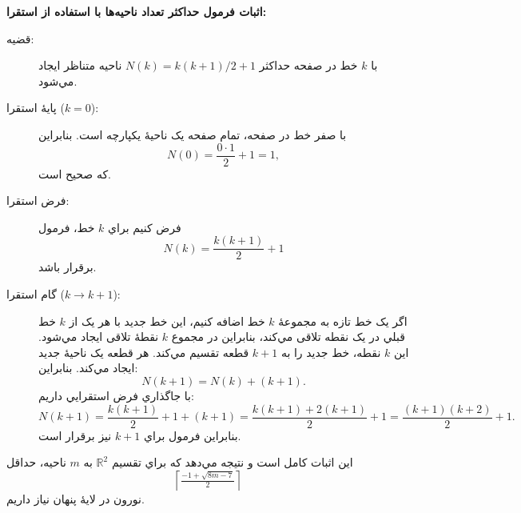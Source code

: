 \begin{enumerate}
	\vspace{1em}
	\noindent
	\textbf{اثبات فرمول حداکثر تعداد ناحیه‌ها با استفاده از استقرا:}
	
	\begin{description}
		\item[قضيه:] با $k$ خط در صفحه حداکثر $N(k)=k(k+1)/2+1$ ناحيه متناظر ايجاد مي‌شود.
		\item[پايهٔ استقرا ($k=0$):] با صفر خط در صفحه، تمام صفحه يک ناحيهٔ يکپارچه است. بنابراين
		\[
		N(0)=\frac{0\cdot1}{2}+1=1,
		\]
		که صحيح است.
		\item[فرض استقرا:] فرض کنيم براي $k$ خط، فرمول
		\[
		N(k)=\frac{k(k+1)}{2}+1
		\]
		برقرار باشد.
		\item[گام استقرا ($k\to k+1$):]
		اگر يک خط تازه به مجموعهٔ $k$ خط اضافه کنيم، اين خط جديد با هر يک از $k$ خط قبلي در يک نقطه تلاقی مي‌کند، بنابراين در مجموع $k$ نقطهٔ تلاقی ايجاد مي‌شود. اين $k$ نقطه، خط جديد را به $k+1$ قطعه تقسيم مي‌کند. هر قطعه يک ناحيهٔ جديد ايجاد مي‌کند. بنابراين:
		\[
		N(k+1)=N(k)+(k+1).
		\]
		با جاگذاري فرض استقرايي داريم:
		\[
		N(k+1)=\frac{k(k+1)}{2}+1+(k+1)
		=\frac{k(k+1)+2(k+1)}{2}+1
		=\frac{(k+1)(k+2)}{2}+1.
		\]
		بنابراين فرمول براي $k+1$ نيز برقرار است.
	\end{description}
	
	\noindent
	اين اثبات کامل است و نتيجه مي‌دهد که براي تقسيم $\mathbb{R}^2$ به $m$ ناحيه، حداقل
	\[
	\left\lceil\tfrac{-1+\sqrt{8m-7}}{2}\right\rceil
	\]
	نورون در لايهٔ پنهان نياز داريم.

	
	
\end{enumerate}
